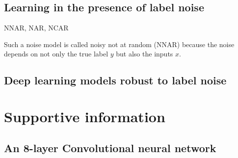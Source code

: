 \subsection{Learning in the presence of label noise}

NNAR, NAR, NCAR

Such a noise model is called noisy not at random (NNAR)   \cite{frenay2014classification} because the noise depends on not only the true label $y$ but also the inputs $x$.

\subsection{Deep learning models robust to label noise}


\section{Supportive information}
\label{sec:support}

\subsection{An 8-layer Convolutional neural network}


